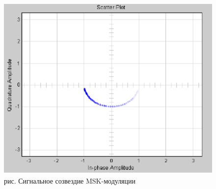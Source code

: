 \documentclass[10pt,a4paper]{report}
\begin{document}
\begin{figure}
\begin{center}
\includegraphics[width=150mm, scale = 0.9]{9_30}\newline
рис.  Сигнальное созвездие MSK-модуляции\newline
\end{center}
\end{figure}
\clearpage
\end{document}

